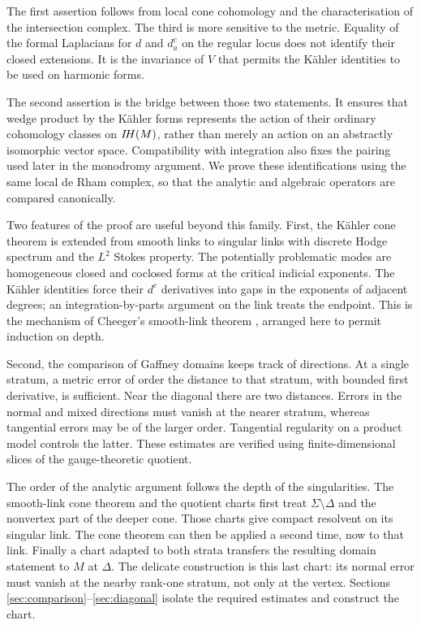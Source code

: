 The first assertion follows from local cone cohomology and the
characterisation of the intersection complex. The third is more
sensitive to the metric. Equality of the formal Laplacians for $d$
and $d_a^c$ on the regular locus does not identify their closed
extensions. It is the invariance of $V$ that permits the K\"ahler
identities to be used on harmonic forms.

The second assertion is the bridge between those two statements.
It ensures that wedge product by the K\"ahler forms represents
the action of their ordinary cohomology classes on $I\!H(M)$,
rather than merely an action on an abstractly isomorphic vector
space. Compatibility with integration also fixes the pairing used
later in the monodromy argument. We prove these identifications
using the same local de Rham complex, so that the analytic and
algebraic operators are compared canonically.

Two features of the proof are useful beyond this family. First, the
K\"ahler cone theorem is extended from smooth links to singular
links with discrete Hodge spectrum and the $L^2$ Stokes property.
The potentially problematic modes are homogeneous closed and
coclosed forms at the critical indicial exponents. The K\"ahler
identities force their $d^c$ derivatives into gaps in the exponents
of adjacent degrees; an integration-by-parts argument on the link
treats the endpoint. This is the mechanism of Cheeger's smooth-link
theorem \cite{cheeger83}, arranged here to permit induction on depth.

Second, the comparison of Gaffney domains keeps track of directions.
At a single stratum, a metric error of order the distance to that
stratum, with bounded first derivative, is sufficient. Near the
diagonal there are two distances. Errors in the normal and mixed
directions must vanish at the nearer stratum, whereas tangential
errors may be of the larger order. Tangential regularity on a
product model controls the latter. These estimates are verified
using finite-dimensional slices of the gauge-theoretic quotient.

The order of the analytic argument follows the depth of the
singularities. The smooth-link cone theorem and the quotient
charts first treat $\Sigma\setminus\Delta$ and the nonvertex
part of the deeper cone. Those charts give compact resolvent on
its singular link. The cone theorem can then be applied a second
time, now to that link. Finally a chart adapted to both strata
transfers the resulting domain statement to $M$ at $\Delta$.
The delicate construction is this last chart: its normal error
must vanish at the nearby rank-one stratum, not only at the
vertex. Sections \ref{sec:comparison}--\ref{sec:diagonal}
isolate the required estimates and construct the chart.

